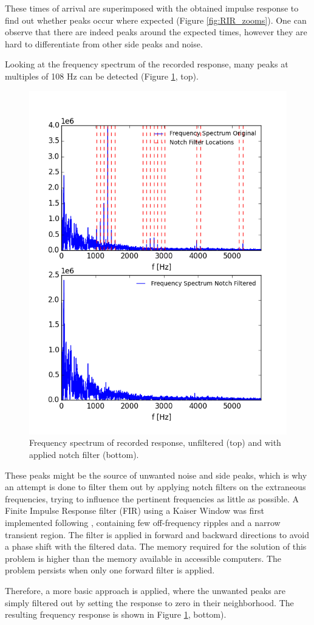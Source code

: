 These times of arrival are superimposed with the obtained impulse response to find out whether peaks occur where expected (Figure \ref{fig:RIR_zooms}).
One can observe that there are indeed peaks around the expected times, however they are hard to differentiate from other side peaks and noise.

Looking at the frequency spectrum of the recorded response, many peaks at multiples of 108 Hz can be detected (Figure \ref{fig:RIR_filtered}, top). 
\begin{figure}[H]
    \centering
    \includegraphics[width=.5\linewidth]{files/notchY.png}
    \caption{Frequency spectrum of recorded response, unfiltered (top) and with applied notch filter (bottom).}
    \label{fig:RIR_filtered}
\end{figure}
These peaks might be the source of unwanted noise and side peaks, which is why an attempt is done to filter them out by applying notch filters on the extraneous frequencies, trying to influence the pertinent frequencies as little as possible. 
A Finite Impulse Response filter (FIR) using a Kaiser Window was first implemented following \cite{Notch}, containing few off-frequency ripples and a narrow transient region. 
The filter is applied in forward and backward directions to avoid a phase shift with the filtered data. 
The memory required for the solution of this problem is higher than the memory available in accessible computers. The problem persists when only one forward filter is applied. 

Therefore, a more basic approach is applied, where the unwanted peaks are simply filtered out by setting the response to zero in their neighborhood. The resulting frequency response is shown in Figure \ref{fig:RIR_filtered}, bottom). 

